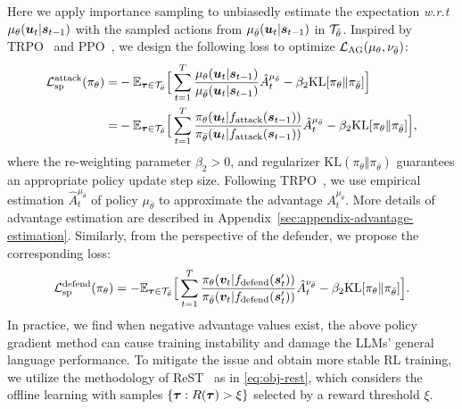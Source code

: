 \documentclass{article}
\theoremstyle{plain}
\theoremstyle{definition}
\theoremstyle{remark}
\begin{document}
Here we apply importance sampling to unbiasedly estimate  the expectation \textit{w.r.t} $\mu_\theta({\bm{u}}_t|{\bm{s}}_{t-1})$ 
 with the sampled actions from $\mu_{\bar{\theta}}({\bm{u}}_t|{\bm{s}}_{t-1})$ in ${\mathcal{T}}_{\bar{\theta}}$. Inspired by TRPO~\citep{schulman2015trust} and PPO~\citep{schulman2017proximal}, we design the following loss to optimize ${\mathcal{L}}_\text{AG}(\mu_\theta, \nu_{\bar{\theta}})$:
\begin{align}\label{eq:offline-po-attacker}
{\mathcal{L}}^\text{attack}_\text{sp}(\pi_\theta)= &  - {\mathbb{E}}_{\bm{\tau}\in{\mathcal{T}}_{\bar{\theta}}} \Big[ \sum_{t=1}^T \frac{\mu_\theta({\bm{u}}_t|{\bm{s}}_{t-1})}{\mu_{\bar{\theta}}({\bm{u}}_t|{\bm{s}}_{t-1})} \hat{A}^{\mu_{\bar{\theta}}}_t  - \beta_2 \text{KL}[\pi_\theta\Vert\pi_{\bar{\theta}}]\Big] \nonumber \\ = & -  {\mathbb{E}}_{\bm{\tau}\in{\mathcal{T}}_{\bar{\theta}}} \Big[ \sum_{t=1}^T \frac{\pi_\theta({\bm{u}}_t|f_\text{attack}({\bm{s}}_{t-1}))}{\pi_{\bar{\theta}}({\bm{u}}_t|f_\text{attack}({\bm{s}}_{t-1}))} \hat{A}^{\mu_{\bar{\theta}}}_t -  \beta_2 \text{KL}[\pi_\theta \Vert \pi_{\bar{\theta}}]\Big],
\end{align}
where the re-weighting parameter $\beta_2>0$, and regularizer $\text{KL}(\pi_\theta\Vert\pi_{\bar{\theta}})$
guarantees an appropriate policy update step size. Following TRPO~\citep{schulman2015trust}, we use empirical estimation $\hat{A}^{\mu_{\bar{\theta}}}_t$ of policy $\mu_{\bar{\theta}}$ to approximate the advantage $A_t^{\mu_\theta}$. 
More details of advantage estimation are described in Appendix~\ref{sec:appendix-advantage-estimation}.
Similarly, from the perspective of the defender, we propose the corresponding loss:
\begin{equation}\label{eq:offline-po-defender}
    {\mathcal{L}}^\text{defend}_\text{sp}(\pi_\theta)= -  {\mathbb{E}}_{\bm{\tau}\in{\mathcal{T}}_{\bar{\theta}}} \Big[ \sum_{t=1}^T \frac{\pi_\theta({\bm{v}}_t|f_\text{defend}({\bm{s}}'_{t}))}{\pi_{\bar{\theta}}({\bm{v}}_t|f_\text{defend}({\bm{s}}'_{t}))} \hat{A}^{\nu_{\bar{\theta}}}_t -  \beta_2 \text{KL}[\pi_\theta \Vert \pi_{\bar{\theta}}]\Big].
\end{equation}
In practice, we find when negative advantage values exist, the above policy gradient method can cause training instability and damage the LLMs' general language performance. %
To mitigate the issue and obtain more stable RL training, we utilize the methodology of ReST~\citep{gulcehre2023reinforced} as in \eqref{eq:obj-rest}, which considers the offline learning with samples $\{\bm{\tau}: R(\bm{\tau}) > \xi\}$  selected by a reward threshold $\xi$.
\end{document}
